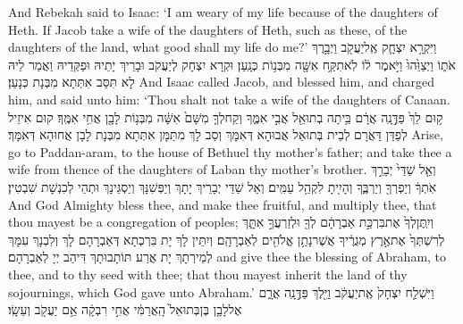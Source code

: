 {And Rebekah said to Isaac: ‘I am weary of my life because of the daughters of Heth. If Jacob take a wife of the daughters of Heth, such as these, of the daughters of the land, what good shall my life do me?’}{}
\newperek
{}%
{וַיִּקְרָ֥א יִצְחָ֛ק אֶֽל\maqqaf יַעֲקֹ֖ב וַיְבָ֣רֶךְ אֹת֑וֹ וַיְצַוֵּ֙הוּ֙ וַיֹּ֣אמֶר ל֔וֹ לֹֽא\maqqaf תִקַּ֥ח אִשָּׁ֖ה מִבְּנ֥וֹת כְּנָֽעַן׃}
{וּקְרָא יִצְחָק לְיַעֲקֹב וּבָרֵיךְ יָתֵיהּ וּפַקְּדֵיהּ וַאֲמַר לֵיהּ לָא תִּסַּב אִתְּתָא מִבְּנָת כְּנָעַן׃}
{And Isaac called Jacob, and blessed him, and charged him, and said unto him: ‘Thou shalt not take a wife of the daughters of Canaan.}{}
{ק֥וּם לֵךְ֙ פַּדֶּ֣נָֽה אֲרָ֔ם בֵּ֥יתָה בְתוּאֵ֖ל אֲבִ֣י אִמֶּ֑ךָ וְקַח\maqqaf לְךָ֤ מִשָּׁם֙ אִשָּׁ֔ה מִבְּנ֥וֹת לָבָ֖ן אֲחִ֥י אִמֶּֽךָ׃}
{קוּם אִיזֵיל לְפַדַּן דַּאֲרָם לְבֵית בְּתוּאֵל אֲבוּהָא דְּאִמָּךְ וְסַב לָךְ מִתַּמָּן אִתְּתָא מִבְּנָת לָבָן אֲחוּהָא דְּאִמָּךְ׃}
{Arise, go to Paddan-aram, to the house of Bethuel thy mother’s father; and take thee a wife from thence of the daughters of Laban thy mother’s brother.}{}
{וְאֵ֤ל שַׁדַּי֙ יְבָרֵ֣ךְ אֹֽתְךָ֔ וְיַפְרְךָ֖ וְיַרְבֶּ֑ךָ וְהָיִ֖יתָ לִקְהַ֥ל עַמִּֽים׃}
{וְאֵל שַׁדַּי יְבָרֵיךְ יָתָךְ וְיַפְּשִׁנָּךְ וְיַסְגֵּינָךְ וּתְהֵי לְכִנְשָׁת שִׁבְטִין׃}
{And God Almighty bless thee, and make thee fruitful, and multiply thee, that thou mayest be a congregation of peoples;}{}
{וְיִֽתֶּן\maqqaf לְךָ֙ אֶת\maqqaf בִּרְכַּ֣ת אַבְרָהָ֔ם לְךָ֖ וּלְזַרְעֲךָ֣ אִתָּ֑ךְ לְרִשְׁתְּךָ֙ אֶת\maqqaf אֶ֣רֶץ מְגֻרֶ֔יךָ אֲשֶׁר\maqqaf נָתַ֥ן אֱלֹהִ֖ים לְאַבְרָהָֽם׃}
{וְיִתֵּין לָךְ יָת בִּרְכְתָא דְּאַבְרָהָם לָךְ וְלִבְנָךְ עִמָּךְ לְמֵירְתָךְ יָת אֲרַע תּוֹתָבוּתָךְ דִּיהַב יְיָ לְאַבְרָהָם׃}
{and give thee the blessing of Abraham, to thee, and to thy seed with thee; that thou mayest inherit the land of thy sojournings, which God gave unto Abraham.’}{}
{וַיִּשְׁלַ֤ח יִצְחָק֙ אֶֽת\maqqaf יַעֲקֹ֔ב וַיֵּ֖לֶךְ פַּדֶּ֣נָֽה אֲרָ֑ם אֶל\maqqaf לָבָ֤ן בֶּן\maqqaf בְּתוּאֵל֙ הָֽאֲרַמִּ֔י אֲחִ֣י רִבְקָ֔ה אֵ֥ם יַעֲקֹ֖ב וְעֵשָֽׂו׃}
